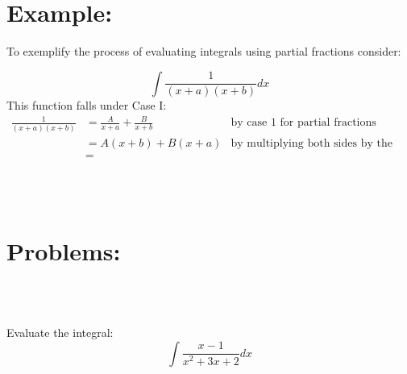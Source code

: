 \documentclass[10pt,letterpaper,cm]{hmcpset}
\begin{document}
\section*{Example:}
To exemplify the process of evaluating integrals using partial fractions consider:


\begin{problem}

  \begin{equation*}
    \int\frac{1}{(x+a)(x+b)}dx 
  \end{equation*}
  This function falls under Case I:
  \begin{align*}
      \frac{1}{(x+a)(x+b)} &= \frac{A}{x+a} + \frac{B}{x+b} & \text{by case 1 for partial fractions}\\
     & =A(x+b) + B(x+a) &\text{by multiplying both sides by the denominator}\\
     & = 
  \end{align*}
\end{problem}\\
\\
\section*{Problems:}\\
\\
\begin{problem}[1]
  Evaluate the integral:
    \begin{equation*}
      \int\frac{x-1}{x^2 + 3x + 2}dx
    \end{equation*}
\end{problem}\\
\end{document}
